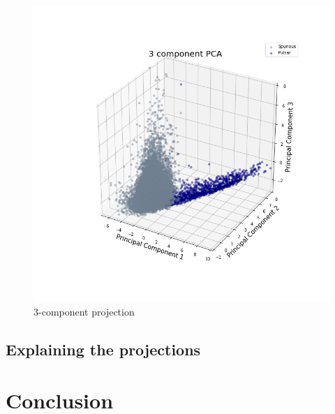 \documentclass[a4paper,12pt]{article}
\begin{document}
    \begin{figure}[ht!]
        \centering
        \includegraphics[clip, trim = 0 3.5cm 0 3.2cm, height=.666\textwidth]{3component-projection}
        \caption{3-component projection}
    \end{figure}

    \newpage

    \subsection{Explaining the projections}

    \section{Conclusion}

    \newpage

    
    
\end{document}
